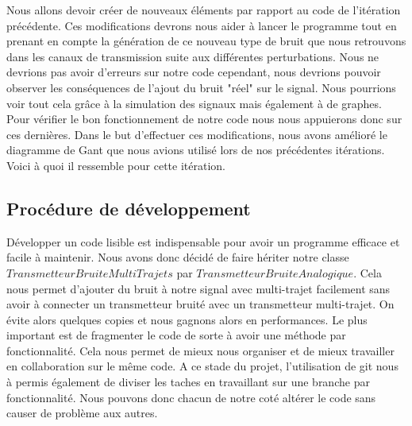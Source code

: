  Nous allons devoir créer de nouveaux éléments par rapport au code de l'itération précédente. Ces modifications devrons nous aider à lancer le programme tout en prenant en compte la génération de ce nouveau type de bruit que nous retrouvons dans les canaux de transmission suite aux différentes perturbations. Nous ne devrions pas avoir d'erreurs sur notre code cependant, nous devrions pouvoir observer les conséquences de l'ajout du bruit "réel" sur le signal. Nous pourrions voir tout cela grâce à la simulation des signaux mais également à de graphes. Pour vérifier le bon fonctionnement de notre code nous nous appuierons donc sur ces dernières. Dans le but d'effectuer ces modifications, nous avons amélioré le diagramme de Gant que nous avions utilisé lors de nos précédentes itérations. Voici à quoi il ressemble pour cette itération.
 
\subsection{Procédure de développement}

Développer un code lisible est indispensable pour avoir un programme efficace et facile à maintenir. Nous avons donc décidé de faire hériter notre classe $TransmetteurBruiteMultiTrajets$ par $TransmetteurBruiteAnalogique$. Cela nous permet d'ajouter du bruit à notre signal avec multi-trajet facilement sans avoir à connecter un transmetteur bruité avec un transmetteur multi-trajet. On évite alors quelques copies et nous gagnons alors en performances. Le plus important est de fragmenter le code de sorte à avoir une méthode par fonctionnalité. Cela nous permet de mieux nous organiser et de mieux travailler en collaboration sur le même code. A ce stade du projet, l'utilisation de git nous à permis également de diviser les taches en travaillant sur une branche par fonctionnalité. Nous pouvons donc chacun de notre coté altérer le code sans causer de problème aux autres.

